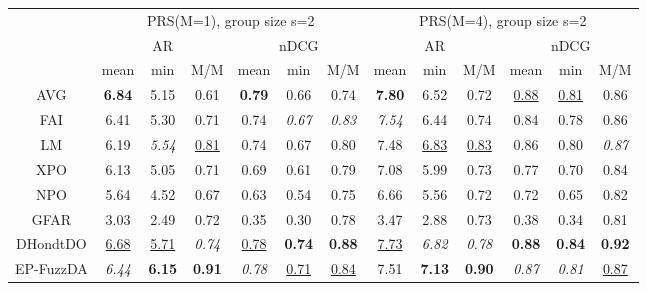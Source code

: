 \begin{tabular}{ c | c c c | c c c || c c c | c c c}

\multicolumn{1}{c}{} & \multicolumn{6}{c}{PRS(M=1), group size s=2} & \multicolumn{6}{c}{PRS(M=4), group size s=2} \\
\multicolumn{1}{c}{} & \multicolumn{3}{c}{AR} & \multicolumn{3}{c}{nDCG} & \multicolumn{3}{c}{AR} & \multicolumn{3}{c}{nDCG} \\
& mean & min & M/M & mean & min & M/M & mean & min & M/M & mean & min & M/M \\
\hline
AVG & \textbf{6.84} & 5.15 & 0.61 & \textbf{0.79} & 0.66 & 0.74 & \textbf{7.80} & 6.52 & 0.72 & \underline{0.88} & \underline{0.81} & 0.86 \\
FAI & 6.41 & 5.30 & 0.71 & 0.74 & \textit{0.67} & \textit{0.83} & \textit{7.54} & 6.44 & 0.74 & 0.84 & 0.78 & 0.86 \\
LM & 6.19 & \textit{5.54} & \underline{0.81} & 0.74 & 0.67 & 0.80 & 7.48 & \underline{6.83} & \underline{0.83} & 0.86 & 0.80 & \textit{0.87} \\
XPO & 6.13 & 5.05 & 0.71 & 0.69 & 0.61 & 0.79 & 7.08 & 5.99 & 0.73 & 0.77 & 0.70 & 0.84 \\
NPO & 5.64 & 4.52 & 0.67 & 0.63 & 0.54 & 0.75 & 6.66 & 5.56 & 0.72 & 0.72 & 0.65 & 0.82 \\
GFAR & 3.03 & 2.49 & 0.72 & 0.35 & 0.30 & 0.78 & 3.47 & 2.88 & 0.73 & 0.38 & 0.34 & 0.81 \\
DHondtDO & \underline{6.68} & \underline{5.71} & \textit{0.74} & \underline{0.78} & \textbf{0.74} & \textbf{0.88} & \underline{7.73} & \textit{6.82} & \textit{0.78} & \textbf{0.88} & \textbf{0.84} & \textbf{0.92} \\
EP-FuzzDA & \textit{6.44} & \textbf{6.15} & \textbf{0.91} & \textit{0.78} & \underline{0.71} & \underline{0.84} & 7.51 & \textbf{7.13} & \textbf{0.90} & \textit{0.87} & \textit{0.81} & \underline{0.87} \\


\end{tabular}
